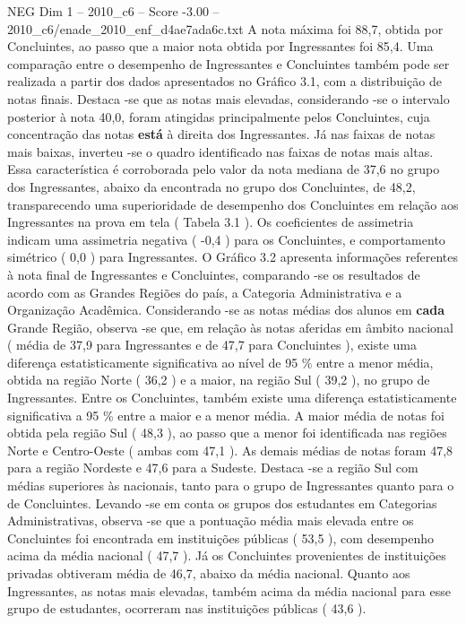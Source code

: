\begin{textsample}{NEG Dim 1 – 2010\_c6 – Score -3.00 – 2010\_c6/enade\_2010\_enf\_d4ae7ada6c.txt}
A nota máxima foi 88,7, obtida por Concluintes, ao passo que a maior nota obtida por Ingressantes foi 85,4.
Uma comparação entre o desempenho de Ingressantes e Concluintes também pode ser realizada a partir dos dados apresentados no Gráfico 3.1, com a distribuição de notas finais.
Destaca -se que as notas mais elevadas, considerando -se o intervalo posterior à nota 40,0, foram atingidas principalmente pelos Concluintes, cuja concentração das notas \textbf{está} à direita dos Ingressantes.
Já nas faixas de notas mais baixas, inverteu -se o quadro identificado nas faixas de notas mais altas.
Essa característica é corroborada pelo valor da nota mediana de 37,6 no grupo dos Ingressantes, abaixo da encontrada no grupo dos Concluintes, de 48,2, transparecendo uma superioridade de desempenho dos Concluintes em relação aos Ingressantes na prova em tela ( Tabela 3.1 ).
Os coeficientes de assimetria indicam uma assimetria negativa ( -0,4 ) para os Concluintes, e comportamento simétrico ( 0,0 ) para Ingressantes.
O Gráfico 3.2 apresenta informações referentes à nota final de Ingressantes e Concluintes, comparando -se os resultados de acordo com as Grandes Regiões do país, a Categoria Administrativa e a Organização Acadêmica.
Considerando -se as notas médias dos alunos em \textbf{cada} Grande Região, observa -se que, em relação às notas aferidas em âmbito nacional ( média de 37,9 para Ingressantes e de 47,7 para Concluintes ), existe uma diferença estatisticamente significativa ao nível de 95 \% entre a menor média, obtida na região Norte ( 36,2 ) e a maior, na região Sul ( 39,2 ), no grupo de Ingressantes.
Entre os Concluintes, também existe uma diferença estatisticamente significativa a 95 \% entre a maior e a menor média.
A maior média de notas foi obtida pela região Sul ( 48,3 ), ao passo que a menor foi identificada nas regiões Norte e Centro-Oeste ( ambas com 47,1 ).
As demais médias de notas foram 47,8 para a região Nordeste e 47,6 para a Sudeste.
Destaca -se a região Sul com médias superiores às nacionais, tanto para o grupo de Ingressantes quanto para o de Concluintes.
Levando -se em conta os grupos dos estudantes em Categorias Administrativas, observa -se que a pontuação média mais elevada entre os Concluintes foi encontrada em instituições públicas ( 53,5 ), com desempenho acima da média nacional ( 47,7 ).
Já os Concluintes provenientes de instituições privadas obtiveram média de 46,7, abaixo da média nacional.
Quanto aos Ingressantes, as notas mais elevadas, também acima da média nacional para esse grupo de estudantes, ocorreram nas instituições públicas ( 43,6 ).

\end{textsample}
